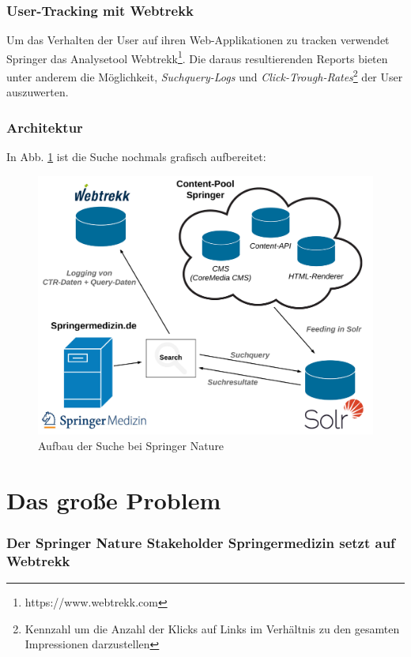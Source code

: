 \subsubsection{User-Tracking mit Webtrekk}
\label{sec:Einfuehrung:AufbauSucheBeiSpringerNature:Webtrekk}

Um das Verhalten der User auf ihren Web-Applikationen zu tracken verwendet Springer das Analysetool Webtrekk\footnote{https://www.webtrekk.com}. Die daraus resultierenden Reports bieten unter anderem die Möglichkeit, \textit{Suchquery-Logs} und \textit{Click-Trough-Rates}\footnote{Kennzahl um die Anzahl der Klicks auf Links im Verhältnis zu den gesamten Impressionen darzustellen} der User auszuwerten.

\pagebreak

\subsubsection{Architektur}
\label{sec:Einfuehrung:AufbauSucheBeiSpringerNature:rchitektur}

In Abb. \ref{fig:SucheSpringerNature} ist die Suche nochmals grafisch aufbereitet:

\begin{figure}[H]
\centering
\includegraphics[width=0.5\linewidth]{gfx/AufbauSucheSpringerNature}
\caption[Aufbau der Suche bei Springer Nature]{Aufbau der Suche bei Springer Nature}
\label{fig:SucheSpringerNature}
\end{figure}

\section{Das große Problem}
\label{sec:Einfuehrung:Problemstellung}

\subsubsection{Der Springer Nature Stakeholder Springermedizin setzt auf Webtrekk}
\label{sec:Einfuehrung:Problemstellung:Springermedizin}

